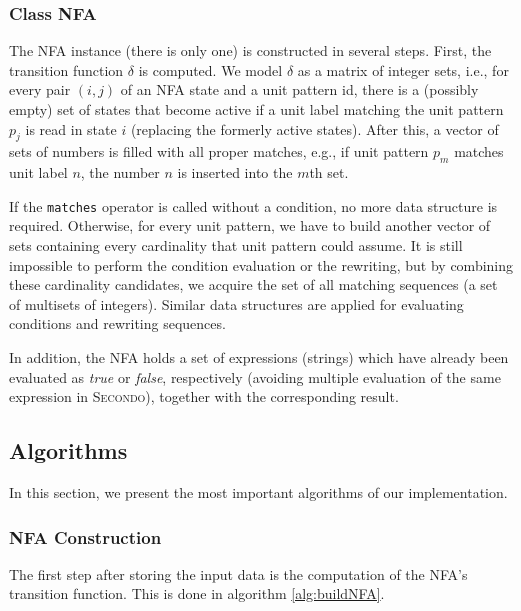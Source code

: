 \documentclass{sig-alternate}
\newcommand{\ic}[1]{\textit{#1}}
\newcommand{\secondo}{\textsc{Secondo}}
\begin{document}
\subsubsection{Class NFA}
The NFA instance (there is only one) is constructed in several steps. First, the transition function $\delta$ is computed. We model $\delta$ as a matrix of integer sets, i.e., for every pair $(i,j)$ of an NFA state and a unit pattern id, there is a (possibly empty) set of states that become active if a unit label matching the unit pattern $p_j$ is read in state $i$ (replacing the formerly active states). After this, a vector of sets of numbers is filled with all proper matches, e.g., if unit pattern $p_m$ matches unit label $n$, the number $n$ is inserted into the $m$th set.

If the \texttt{matches} operator is called without a condition, no more data structure is required. Otherwise, for every unit pattern, we have to build another vector of sets containing every cardinality that unit pattern could assume. It is still impossible to perform the condition evaluation or the rewriting, but by combining these cardinality candidates, we acquire the set of all matching sequences (a set of multisets of integers). Similar data structures are applied for evaluating conditions and rewriting sequences.

In addition, the NFA holds a set of expressions (strings) which have already been evaluated as \ic{true} or \ic{false}, respectively (avoiding multiple evaluation of the same expression in \secondo), together with the corresponding result.

\subsection{Algorithms}
\IncMargin{-1mm}
\SetInd{2.5mm}{1.5mm}
\SetNlSkip{2mm}
In this section, we present the most important algorithms of our implementation.

\subsubsection{NFA Construction}
The first step after storing the input data is the computation of the NFA's transition function. This is done in algorithm \ref{alg:buildNFA}.
\end{document}
